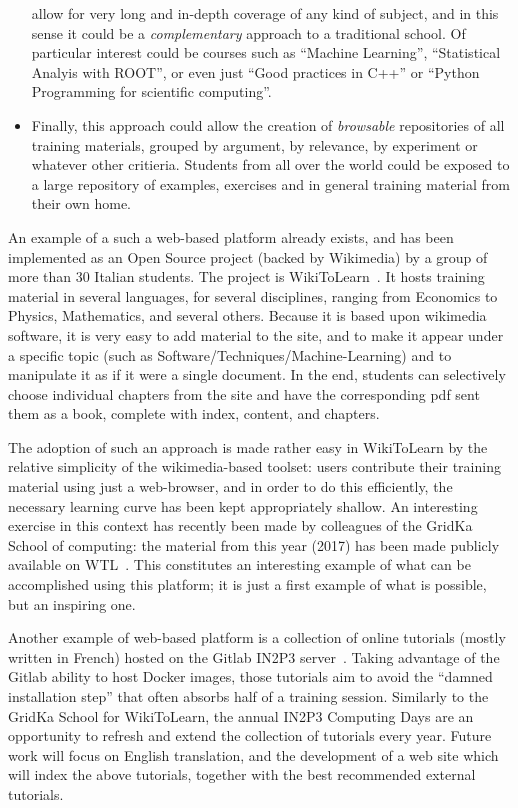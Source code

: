 \documentclass[12pt,a4paper]{article}
\begin{document}
\begin{itemize}
   allow for very long and in-depth coverage of any kind of subject, and in this
   sense it could be a {\it complementary} approach to a traditional school. Of
   particular interest could be courses such as ``Machine Learning'',
   ``Statistical Analyis with ROOT'', or even just ``Good practices in C++'' or
   ``Python Programming for scientific computing''.
   \item Finally, this approach could allow the creation of {\it browsable}
   repositories of all training materials, grouped by argument, by relevance, by
   experiment or whatever other critieria. Students from all over the world
   could be exposed to a large repository of examples, exercises and in general
   training material from their own home.
\end{itemize}

An example of a such a web-based platform already exists, and has been
implemented as an Open Source project (backed by Wikimedia) by a group of more
than 30 Italian students. The project is WikiToLearn~\cite{WikiToLearn}. It hosts training material in
several languages, for several disciplines, ranging from Economics to Physics,
Mathematics, and several others. Because it is based upon
wikimedia~\cite{WikiMedia} software, it is very easy
to add material to the site, and to make it appear under a specific topic (such
as Software/Techniques/Machine-Learning) and to manipulate it as if it
were a single document. In the end, students can selectively choose individual
chapters from the site and have the corresponding pdf sent them as a book,
complete with index, content, and chapters.

The adoption of such an approach is made rather easy in WikiToLearn by the
relative simplicity of the wikimedia-based toolset: users contribute their
training material using just a web-browser, and in order to do this efficiently,
the necessary learning curve has been kept appropriately shallow.
An interesting exercise in this context has recently been made by colleagues of
the GridKa School of computing: the material from this year (2017) has been made
publicly available on WTL~\cite{WikiToLearnGridka}.
This constitutes an interesting example of what can be accomplished using this
platform; it is just a first example of what is possible, but an inspiring one.

Another example of web-based platform is a collection of online tutorials
(mostly written in French) hosted on the Gitlab IN2P3
server~\cite{Code-Swim-Coaches}. Taking advantage of
the Gitlab ability to host Docker images, those tutorials aim to avoid the
``damned installation step'' that often absorbs half of a training session.
Similarly to the GridKa School for WikiToLearn, the annual IN2P3 Computing
Days are an opportunity to refresh and extend the collection of
tutorials every year. Future work will focus on English translation, and the
development of a web site which will index the above tutorials, together with
the best recommended external tutorials.
\end{document}
